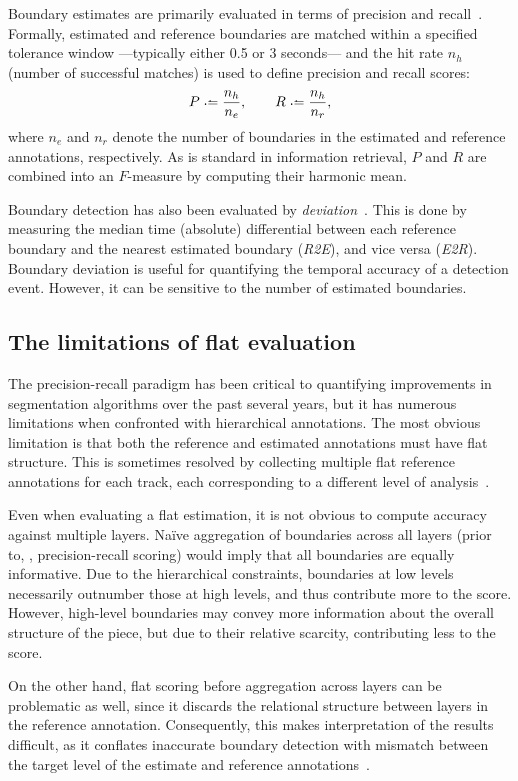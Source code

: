 \documentclass{article}
\begin{document}
Boundary estimates are primarily evaluated in terms of precision and recall~\cite{turnbull2007supervised}.
Formally, estimated and reference boundaries are matched within a specified tolerance window ---typically either 0.5 or 3 seconds--- and the hit rate $n_h$ (number of successful matches) is used to define precision and recall scores:
\begin{equation}
P \defeq \frac{n_h}{n_e}, \quad\quad R \defeq \frac{n_h}{n_r},
\end{equation}
where $n_e$ and $n_r$ denote the number of boundaries in the estimated and reference
annotations, respectively.
As is standard in information retrieval, $P$ and $R$ are combined into an $F$-measure by computing their harmonic mean.

Boundary detection has also been evaluated by \emph{deviation}~\cite{turnbull2007supervised}.
This is done by measuring the median time (absolute) differential between each reference boundary and the nearest estimated boundary (\emph{R2E}), and vice versa (\emph{E2R}).
Boundary deviation is useful for quantifying the temporal accuracy of a detection event.
However, it can be sensitive to the number of estimated boundaries.

\subsection{The limitations of flat evaluation}
The precision-recall paradigm has been critical to quantifying improvements in segmentation algorithms over the past several years, but it has numerous 
limitations when confronted with hierarchical annotations.
The most obvious limitation is that both the reference and estimated annotations must have flat structure.
This is sometimes resolved by collecting multiple flat reference annotations for each track, 
each corresponding to a different level of analysis~\cite{Smith2011}.

Even when evaluating a flat estimation, it is not obvious to compute accuracy against multiple layers.
Na\"ive aggregation of boundaries across all layers (prior to, \eg, precision-recall scoring) would imply 
that all boundaries are equally informative.
Due to the hierarchical constraints, boundaries at low levels necessarily outnumber those at high levels, and thus contribute more to the score.
However, high-level boundaries may convey more information about the overall structure of the piece, but due to their relative scarcity, contributing less to the score.

On the other hand, flat scoring before aggregation across layers can be problematic as well, 
since it discards the relational structure between layers in the reference annotation.
Consequently, this makes interpretation of the results difficult, as it conflates
inaccurate boundary detection with mismatch between the target level of the estimate and reference
annotations~\cite{Smith2013}.
\end{document}
